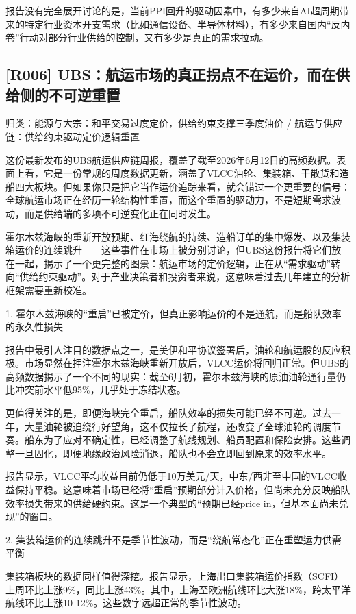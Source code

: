\documentclass[11pt]{ctexart}
\begin{document}
报告没有完全展开讨论的是，当前PPI回升的驱动因素中，有多少来自AI超周期带来的特定行业资本开支需求（比如通信设备、半导体材料），有多少来自国内“反内卷”行动对部分行业供给的控制，又有多少是真正的需求拉动。

\subsection{[R006] UBS：航运市场的真正拐点不在运价，而在供给侧的不可逆重置}
{\small\color{refgray}归类：能源与大宗：和平交易过度定价，供给约束支撑三季度油价 / 航运与供应链：供给约束驱动定价逻辑重置}

这份最新发布的UBS航运供应链周报，覆盖了截至2026年6月12日的高频数据。表面上看，它是一份常规的周度数据更新，涵盖了VLCC油轮、集装箱、干散货和造船四大板块。但如果你只是把它当作运价追踪来看，就会错过一个更重要的信号：全球航运市场正在经历一轮结构性重置，而这个重置的驱动力，不是短期需求波动，而是供给端的多项不可逆变化正在同时发生。

霍尔木兹海峡的重新开放预期、红海绕航的持续、造船订单的集中爆发、以及集装箱运价的连续跳升——这些事件在市场上被分别讨论，但UBS这份报告将它们放在一起，揭示了一个更完整的图景：航运市场的定价逻辑，正在从“需求驱动”转向“供给约束驱动”。对于产业决策者和投资者来说，这意味着过去几年建立的分析框架需要重新校准。

1. 霍尔木兹海峡的“重启”已被定价，但真正影响运价的不是通航，而是船队效率的永久性损失

报告中最引人注目的数据点之一，是美伊和平协议签署后，油轮和航运股的反应积极。市场显然在押注霍尔木兹海峡重新开放后，VLCC运价将回归正常。但UBS的高频数据揭示了一个不同的现实：截至6月初，霍尔木兹海峡的原油油轮通行量仍比冲突前水平低95\%，几乎处于冻结状态。

更值得关注的是，即便海峡完全重启，船队效率的损失可能已经不可逆。过去一年，大量油轮被迫绕行好望角，这不仅拉长了航程，还改变了全球油轮的调度节奏。船东为了应对不确定性，已经调整了航线规划、船员配置和保险安排。这些调整一旦固化，即便地缘政治风险消退，船队也不会立即回到原来的效率水平。

报告显示，VLCC平均收益目前仍低于10万美元/天，中东/西非至中国的VLCC收益保持平稳。这意味着市场已经将“重启”预期部分计入价格，但尚未充分反映船队效率损失带来的供给硬约束。这是一个典型的“预期已经price in，但基本面尚未兑现”的窗口。

2. 集装箱运价的连续跳升不是季节性波动，而是“绕航常态化”正在重塑运力供需平衡

集装箱板块的数据同样值得深挖。报告显示，上海出口集装箱运价指数（SCFI）上周环比上涨9\%，同比上涨43\%。其中，上海至欧洲航线环比大涨18\%，跨太平洋航线环比上涨10-12\%。这些数字远超正常的季节性波动。
\end{document}

